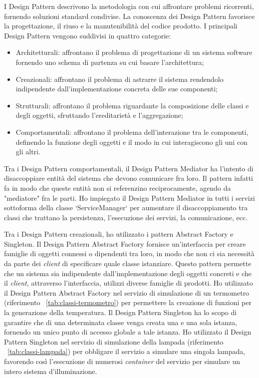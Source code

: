 I Design Pattern descrivono la metodologia con cui affrontare problemi ricorrenti, fornendo soluzioni standard condivise.
La conoscenza dei Design Pattern favorisce la progettazione, il riuso e la manutenibilità del codice prodotto.
I principali Design Pattern vengono suddivisi in quattro categorie:
\begin{itemize}
	\item Architetturali: affrontano il problema di progettazione di un sistema software fornendo uno schema di partenza su cui basare l’architettura;
	\item Creazionali: affrontano il problema di astrarre il sistema rendendolo indipendente dall’implementazione concreta delle sue componenti;
	\item Strutturali: affrontano il problema riguardante la composizione delle classi e degli oggetti, sfruttando l’ereditarietà e l’aggregazione;
	\item Comportamentali: affrontano il problema dell’interazione tra le componenti, definendo la funzione degli oggetti e il modo in cui interagiscono gli uni con gli altri.
\end{itemize}

Tra i Design Pattern comportamentali, il Design Pattern Mediator ha l'intento di disaccoppiare entità del sistema che devono comunicare fra loro. Il pattern infatti fa in modo che queste entità non si referenzino reciprocamente, agendo da "mediatore" fra le parti.
Ho impiegato il Design Pattern Mediator in tutti i servizi sottoforma della classe `ServiceManager` per aumentare il disaccoppiamento tra classi che trattano la persistenza, l'esecuzione dei servizi, la comunicazione, ecc.

Tra i Design Pattern creazionali, ho utilizzato i pattern Abstract Factory e Singleton.
Il Design Pattern Abstract Factory fornisce un'interfaccia per creare famiglie di oggetti connessi o dipendenti tra loro, in modo che non ci sia necessità da parte dei \emph{client} di specificare quale classe istanziare. Questo pattern permette che un sistema sia indipendente dall'implementazione degli oggetti concreti e che il \emph{client}, attraverso l'interfaccia, utilizzi diverse famiglie di prodotti.
Ho utilizzato il Design Pattern Abstract Factory nel servizio di simulazione di un termometro (riferimento ~\ref{tab:classi-termometro}) per permettere la creazione di funzioni per la generazione della temperatura.
Il Design Pattern Singleton ha lo scopo di garantire che di una determinata classe venga creata una e una sola istanza, fornendo un unico punto di accesso globale a tale istanza.
Ho utilizzato il Design Pattern Singleton nel servizio di simulazione della lampada (riferimento ~\ref{tab:classi-lampada}) per obbligare il servizio a simulare una singola lampada, favorendo così l'esecuzione di numerosi \emph{container} del servizio per simulare un intero sistema d'illuminazione.


